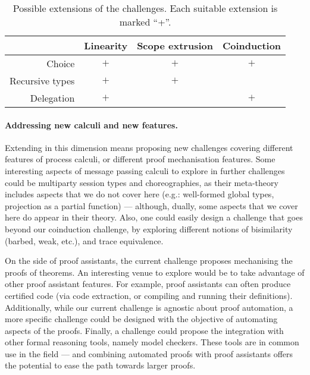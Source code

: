 \documentclass[runningheads]{llncs}
\begin{document}
\begin{table}[btp]
  \caption{Possible extensions of the challenges. Each suitable extension is marked ``+''. \label{tab:extensions}}
  \begin{center}\small
    \vspace{-4mm}%
    \begin{tabular}{|r|c|c|c|}
      \hline
      & Linearity & Scope extrusion & Coinduction \\
      \hline
      Choice & $+$ & $+$  & $+$ \\
      \hline
      Recursive types & $+$  & $+$ & \\
      \hline
      Delegation & $+$ & & $+$ \\
      \hline
    \end{tabular}
    \vspace{-3mm}%
  \end{center}
\end{table}

\vspace{-1mm}%
\paragraph{Addressing new calculi and new features.}
Extending in this dimension
means proposing new challenges covering different features of
process calculi, or different proof mechanisation features.
Some interesting aspects of message passing calculi to explore in
further challenges could be multiparty session types and
choreographies, as their meta-theory includes aspects
that we do not cover here (e.g.: well-formed global types,
projection as a partial function) --- although, dually, some aspects
that we cover here do appear in their theory. Also, one could easily
design a challenge that goes beyond our coinduction challenge, by
exploring different notions of bisimilarity (barbed, weak, etc.),
and trace equivalence.

On the side of proof assistants, the current challenge proposes mechanising the
proofs of theorems. An interesting venue to explore would be to take advantage
of other proof assistant features. For example, proof assistants can often
produce certified code (via code extraction, or compiling and running their
definitions). Additionally, while our current challenge is agnostic about proof
automation, a more specific challenge could be designed with the objective of
automating aspects of the proofs. Finally, a challenge could propose the
integration with other formal reasoning tools, namely model checkers. These
tools are in common use in the field --- and combining automated proofs with
proof assistants offers the potential to ease the path towards larger proofs.
\end{document}

